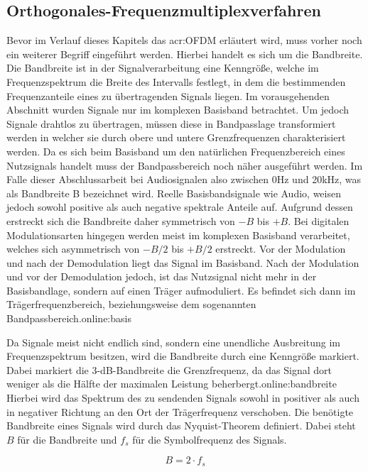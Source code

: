 \subsection{Orthogonales-Frequenzmultiplexverfahren}
\label{subsec:ofdm}
Bevor im Verlauf dieses Kapitels das \gls{acr:OFDM} erläutert wird, muss vorher noch ein weiterer Begriff eingeführt werden. Hierbei handelt es sich um die Bandbreite. Die Bandbreite ist in der Signalverarbeitung eine Kenngröße, welche im Frequenzspektrum die Breite des Intervalls festlegt, in dem die bestimmenden Frequenzanteile eines zu übertragenden Signals liegen. Im vorausgehenden Abschnitt wurden Signale nur im komplexen Basisband betrachtet. Um jedoch Signale drahtlos zu übertragen, müssen diese in Bandpasslage transformiert werden in welcher sie durch obere und untere Grenzfrequenzen charakterisiert werden.\cite{hftech} Da es sich beim Basisband um den natürlichen Frequenzbereich eines Nutzsignals handelt muss der Bandpassbereich noch näher ausgeführt werden. Im Falle dieser Abschlussarbeit bei Audiosignalen also zwischen 0Hz und 20kHz, was als Bandbreite B bezeichnet wird. Reelle Basisbandsignale wie Audio, weisen jedoch sowohl positive als auch negative spektrale Anteile auf. Aufgrund dessen erstreckt sich die Bandbreite daher symmetrisch von $-B$ bis $+B$. Bei digitalen Modulationsarten hingegen werden meist im komplexen Basisband verarbeitet, welches sich asymmetrisch von $-B/2$ bis $+B/2$ erstreckt. Vor der Modulation und nach der Demodulation liegt das Signal im Basisband. Nach der Modulation und vor der Demodulation jedoch, ist das Nutzsignal nicht mehr in der Basisbandlage, sondern auf einen Träger aufmoduliert. Es befindet sich dann im Trägerfrequenzbereich, beziehungsweise dem sogenannten Bandpassbereich.\gls{online:basis} 

Da Signale meist nicht endlich sind, sondern eine unendliche Ausbreitung im Frequenzspektrum besitzen, wird die Bandbreite durch eine Kenngröße markiert. Dabei markiert die 3-dB-Bandbreite die Grenzfrequenz, da das Signal dort weniger als die
Hälfte der maximalen Leistung beherbergt.\gls{online:bandbreite} Hierbei wird das Spektrum des zu sendenden Signals sowohl in positiver als auch in negativer Richtung an den Ort der Trägerfrequenz verschoben. Die benötigte Bandbreite eines Signals wird durch das Nyquist-Theorem definiert. Dabei steht $B$ für die Bandbreite und $f_{s}$ für die Symbolfrequenz des Signals.

\begin{equation}
	\label{equ:bandbreite}
	B = 2 \cdot f_{s}
\end{equation}

